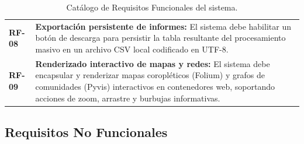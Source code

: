 \documentclass[12pt,a4paper,onecolumn,oneside]{report}
\begin{document}
\begin{table}[htbp]
\begin{tabular}{lp{10cm}}
\textbf{RF-08} & \textbf{Exportación persistente de informes:} El sistema debe habilitar un botón de descarga para persistir la tabla resultante del procesamiento masivo en un archivo CSV local codificado en UTF-8. \\
\textbf{RF-09} & \textbf{Renderizado interactivo de mapas y redes:} El sistema debe encapsular y renderizar mapas coropléticos (Folium) y grafos de comunidades (Pyvis) interactivos en contenedores web, soportando acciones de zoom, arrastre y burbujas informativas. \\ \hline
\end{tabular}
\caption{Catálogo de Requisitos Funcionales del sistema.}
\label{tab:requisitos_funcionales}
\end{table}
\clearpage

\subsection{Requisitos No Funcionales}
\end{document}
